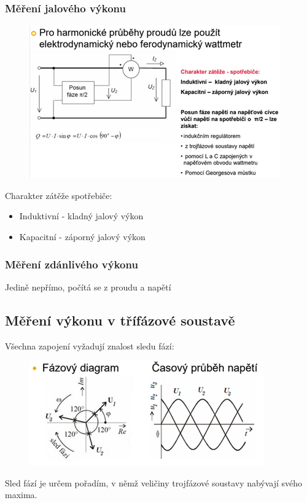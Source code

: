 \subsubsection*{Měření jalového výkonu}
\begin{figure}[H]
    \includegraphics*[scale = 1.3]{images/jalovec.png}
\end{figure}
Charakter zátěže spotřebiče:
\begin{itemize}
    \item Induktivní - kladný jalový výkon
    \item Kapacitní - záporný jalový výkon
\end{itemize}

\subsubsection*{Měření zdánlivého výkonu}
Jedině nepřímo, počítá se z proudu a napětí


\subsection*{Měření výkonu v třífázové soustavě}
Všechna zapojení vyžadují znalost sledu fází:
\begin{figure}[H]
    \includegraphics*[scale = 1.2]{images/fazovyDiagram.png}
\end{figure}
Sled fází je určem pořadím, v němž veličiny trojfázové soustavy nabývají svého maxima.\\

